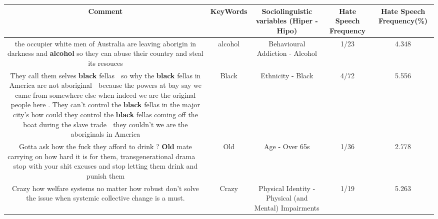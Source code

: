 \documentclass[11pt]{article}
\newlength\mylength
\begin{document}
\begin{center}
\setlength\mylength{\dimexpr\textwidth - 1\arrayrulewidth - 50\tabcolsep}
\begin{longtable}{|C{.65\mylength}|C{.30\mylength}|C{.12\mylength}|C{.12\mylength}|C{.12\mylength}|}
\hline
\textbf{Comment} & \textbf{KeyWords} & \textbf{Sociolinguistic variables (Hiper - Hipo)}  & \textbf{Hate Speech Frequency} & \textbf{Hate Speech Frequency(\%)} \\
\hline{}\small the occupier white men of Australia are leaving aborigin in darkness and \textbf{alcohol} so they can abuse their country and steal its resouces\normalsize   & alcohol & Behavioural Addiction - Alcohol & 1/23 & 4.348 \\  \hline
  \small They call them selves \textbf{black} fellas 🤔 so why the \textbf{black} fellas in America are not aboriginal 🤔 because the powers at bay say we came from somewhere else when indeed we are the original people here . They can't control the \textbf{black} fellas in the major city's how could they control the \textbf{black} fellas coming off the boat during the slave trade 🤔 they couldn't we are the aboriginals in America\normalsize   & Black & Ethnicity - Black & 4/72 & 5.556 \\  \hline
  \small Gotta ask how the fuck they afford to drink ? \textbf{Old} mate carrying on how hard it is for them, transgenerational drama 🥴🥴🥴 stop with your shit excuses and stop letting them drink and punish them\normalsize   & Old & Age - Over 65s & 1/36 & 2.778 \\  \hline
  \small Crazy how welfare systems no matter how robust don't solve the issue when systemic collective change is a must.\normalsize   & Crazy & Physical Identity - Physical (and Mental) Impairments & 1/19 & 5.263 \\  \hline

\end{longtable}
\end{center}
\end{document}
